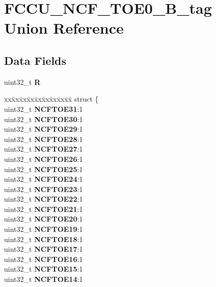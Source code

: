 \hypertarget{unionFCCU__NCF__TOE0__32B__tag}{}\section{F\+C\+C\+U\+\_\+\+N\+C\+F\+\_\+\+T\+O\+E0\+\_\+B\+\_\+tag Union Reference}
\label{unionFCCU__NCF__TOE0__32B__tag}
\subsection*{Data Fields}
\begin{DoxyCompactItemize}
\item 
\mbox{\label{unionFCCU__NCF__TOE0__32B__tag_a7e1653b4d311a8c8bfda992aba46197e}} 
uint32\+\_\+t {\bfseries R}
\item 
\mbox{\label{unionFCCU__NCF__TOE0__32B__tag_a64961a2181492279392abaee2f15803e}} 
\begin{tabbing}
xx\=xx\=xx\=xx\=xx\=xx\=xx\=xx\=xx\=\kill
struct \{\\
\>uint32\_t {\bfseries NCFTOE31}:1\\
\>uint32\_t {\bfseries NCFTOE30}:1\\
\>uint32\_t {\bfseries NCFTOE29}:1\\
\>uint32\_t {\bfseries NCFTOE28}:1\\
\>uint32\_t {\bfseries NCFTOE27}:1\\
\>uint32\_t {\bfseries NCFTOE26}:1\\
\>uint32\_t {\bfseries NCFTOE25}:1\\
\>uint32\_t {\bfseries NCFTOE24}:1\\
\>uint32\_t {\bfseries NCFTOE23}:1\\
\>uint32\_t {\bfseries NCFTOE22}:1\\
\>uint32\_t {\bfseries NCFTOE21}:1\\
\>uint32\_t {\bfseries NCFTOE20}:1\\
\>uint32\_t {\bfseries NCFTOE19}:1\\
\>uint32\_t {\bfseries NCFTOE18}:1\\
\>uint32\_t {\bfseries NCFTOE17}:1\\
\>uint32\_t {\bfseries NCFTOE16}:1\\
\>uint32\_t {\bfseries NCFTOE15}:1\\
\>uint32\_t {\bfseries NCFTOE14}:1\\

\end{tabbing}
\end{DoxyCompactItemize}
